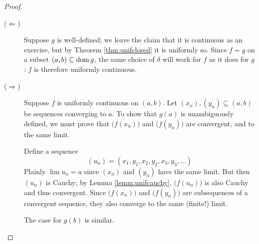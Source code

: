 \begin{proof}
	\begin{description}
		\item[\normalfont ($\Leftarrow$)] Suppose $g$ is well-defined; we leave the claim that it is continuous as an exercise, but by Theorem \ref{thm:unifclosed} it is uniformly so. Since $f=g$ on a subset $(a,b)\subseteq \operatorname{dom} g$, the same choice of $\delta$ will work for $f$ as it does for $g$: $f$ is therefore uniformly continuous.
		
		\item[\normalfont ($\Rightarrow$)] Suppose $f$ is uniformly continuous on $(a,b)$. Let $(x_n),(y_n)\subseteq (a,b)$ be sequences converging to $a$. To show that $g(a)$ is unambiguously defined, we must prove that $\bigl(f(x_n)\bigr)$ and $\bigl(f(y_n)\bigr)$ are convergent, and to the same limit.\par
		Define a sequence
		\[
			(u_n)=(x_1,y_1,x_2,y_2,x_3,y_3,\ldots)
		\]
		Plainly $\lim u_n=a$ since $(x_n)$ and $(y_n)$ have the same limit. But then $(u_n)$ is Cauchy; by Lemma \ref{lemm:unifcauchy}, $\bigl(f(u_n)\bigr)$ is also Cauchy and thus convergent. Since $\bigl(f(x_n)\bigr)$ and $\bigl(f(y_n)\bigr)$ are subsequences of a convergent sequence, they also converge to the same (finite!) limit.\par
		The case for $g(b)$ is similar.\qedhere
	\end{description}
\end{proof}


\goodbreak


